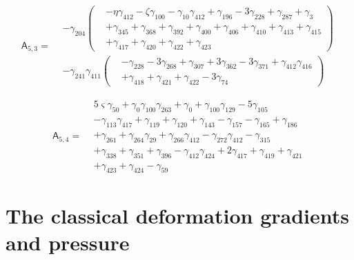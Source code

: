 \[\mathsf A_{5,3}=\begin{aligned}&- \gamma_{204} \left(\begin{aligned}&- \eta  \gamma_{412}- \zeta  \gamma_{100}- \gamma_{10} \gamma_{412}+ \gamma_{196}- 3 \gamma_{228}+ \gamma_{287}+ \gamma_{3}\\&+ \gamma_{345}+ \gamma_{368}+ \gamma_{392}+ \gamma_{400}+ \gamma_{406}+ \gamma_{410}+ \gamma_{413}+ \gamma_{415}\\&+ \gamma_{417}+ \gamma_{420}+ \gamma_{422}+ \gamma_{423}\end{aligned}\right)\\&- \gamma_{241} \gamma_{411} \left(\begin{aligned}&- \gamma_{228}- 3 \gamma_{268}+ \gamma_{307}+ 3 \gamma_{362}- 3 \gamma_{371}+ \gamma_{412} \gamma_{416}\\&+ \gamma_{418}+ \gamma_{421}+ \gamma_{422}- 3 \gamma_{74}\end{aligned}\right)\end{aligned}\]

\[\mathsf A_{5,4}=\begin{aligned}& 5 \varsigma  \gamma_{50}+ \gamma_{0} \gamma_{100} \gamma_{263}+ \gamma_{0}+ \gamma_{100} \gamma_{129}- 5 \gamma_{105}\\&- \gamma_{113} \gamma_{417}+ \gamma_{119}+ \gamma_{120}+ \gamma_{143}- \gamma_{157}- \gamma_{165}+ \gamma_{186}\\&+ \gamma_{261}+ \gamma_{264} \gamma_{29}+ \gamma_{266} \gamma_{412}- \gamma_{272} \gamma_{412}- \gamma_{315}\\&+ \gamma_{338}+ \gamma_{351}+ \gamma_{396}- \gamma_{412} \gamma_{424}+ 2 \gamma_{417}+ \gamma_{419}+ \gamma_{421}\\&+ \gamma_{423}+ \gamma_{424}- \gamma_{59}\end{aligned}\]
\endgroup

\clearpage
\section{The classical deformation gradients and pressure}\label{supp:classical}


